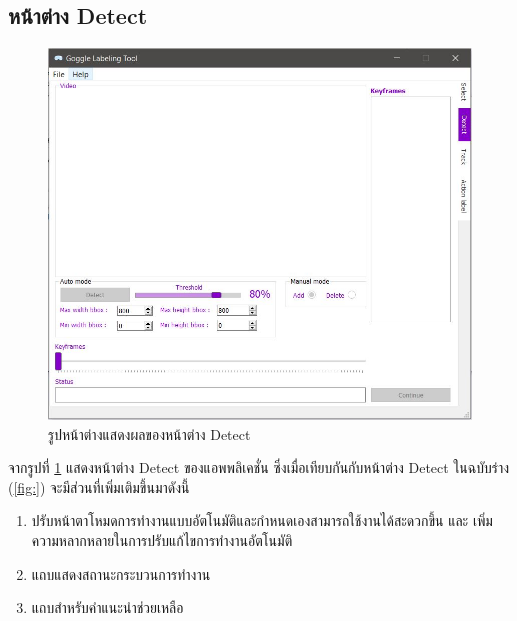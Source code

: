 \subsection*{หน้าต่าง Detect}
\begin{figure}[!ht]
  \centering
    \includegraphics[scale=0.65]{chapter4/images/Final_ui/Detect.jpg}
    \caption{รูปหน้าต่างแสดงผลของหน้าต่าง Detect}
    \label{fig:final_detect}
\end{figure}
จากรูปที่ \ref{fig:final_detect} แสดงหน้าต่าง Detect ของแอพพลิเคชั่น ซึ่งเมื่อเทียบกันกับหน้าต่าง Detect ในฉบับร่าง (\ref{fig:}) จะมีส่วนที่เพิ่มเติมขึ้นมาดังนี้
\begin{enumerate}
	\item ปรับหน้าตาโหมดการทำงานแบบอัตโนมัติและกำหนดเองสามารถใช้งานได้สะดวกขึ้น และ เพิ่มความหลากหลายในการปรับแก้ไขการทำงานอัตโนมัติ
	\item แถบแสดงสถานะกระบวนการทำงาน
	\item แถบสำหรับคำแนะนำช่วยเหลือ
\end{enumerate}		

\clearpage
